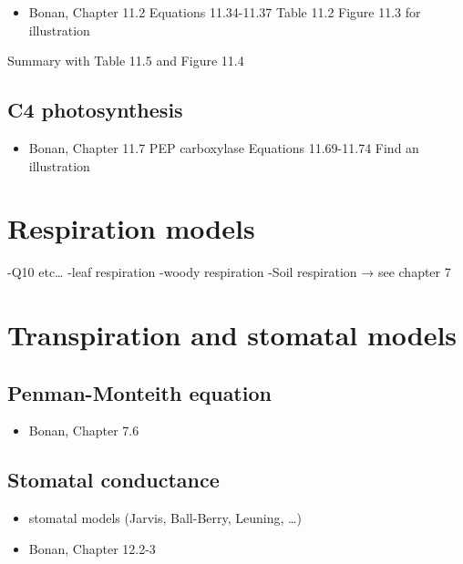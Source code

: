 \documentclass[
  oneside]{book}
\providecommand{\tightlist}{%
  \setlength{\itemsep}{0pt}\setlength{\parskip}{0pt}}
\begin{document}
\begin{itemize}
\tightlist
\item
  Bonan, Chapter 11.2
  Equations 11.34-11.37
  Table 11.2
  Figure 11.3 for illustration
\end{itemize}

Summary with Table 11.5 and Figure 11.4

\hypertarget{c4-photosynthesis}{%
\subsection{C4 photosynthesis}\label{c4-photosynthesis}}

\begin{itemize}
\tightlist
\item
  Bonan, Chapter 11.7
  PEP carboxylase
  Equations 11.69-11.74
  Find an illustration
\end{itemize}

\hypertarget{respiration-models}{%
\section{Respiration models}\label{respiration-models}}

-Q10 etc\ldots{}
-leaf respiration
-woody respiration
-Soil respiration → see chapter 7

\hypertarget{transpiration-and-stomatal-models}{%
\section{Transpiration and stomatal models}\label{transpiration-and-stomatal-models}}

\hypertarget{penman-monteith-equation}{%
\subsection{Penman-Monteith equation}\label{penman-monteith-equation}}

\begin{itemize}
\tightlist
\item
  Bonan, Chapter 7.6
\end{itemize}

\hypertarget{stomatal-conductance}{%
\subsection{Stomatal conductance}\label{stomatal-conductance}}

\begin{itemize}
\tightlist
\item
  stomatal models (Jarvis, Ball-Berry, Leuning, \ldots)
\item
  Bonan, Chapter 12.2-3
\end{itemize}
\end{document}

